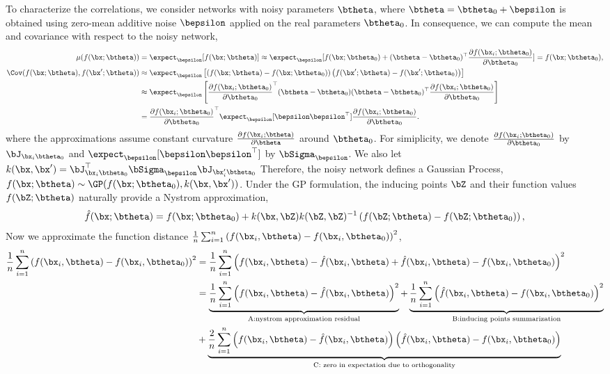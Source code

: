 To characterize the correlations, we consider networks with noisy parameters $\btheta$, where $\btheta = \btheta_0 + \bepsilon$ is obtained using zero-mean additive noise $\bepsilon$ applied on the real parameters $\btheta_0$. In consequence, we can compute the mean and covariance with respect to the noisy network,
\begin{align}
    \mu(f(\bx; \btheta)) &= \expect_{\bepsilon} [ f(\bx; \btheta)] \approx \expect_{\bepsilon}[ f(\bx; \btheta_0) + (\btheta - \btheta_0)^{\top}  \frac{\partial f(\bx_i; \btheta_0)}{\partial \btheta_0}] = f(\bx; \btheta_0), \\
    \Cov(f(\bx; \btheta), f(\bx'; \btheta)) &\approx \expect_{\bepsilon} \left[ \left(f(\bx; \btheta)-f(\bx; \btheta_0)\right) \left(f(\bx'; \btheta)-f(\bx'; \btheta_0)\right) \right] \notag \\
    &\approx \expect_{\bepsilon} \left[  \frac{\partial f(\bx_i; \btheta_0)}{\partial \btheta_0}^{\top} (\btheta - \btheta_0) (\btheta - \btheta_0)^{\top}  \frac{\partial f(\bx_i; \btheta_0)}{\partial \btheta_0} \right] \notag \\
    &=  \frac{\partial f(\bx_i; \btheta_0)}{\partial \btheta_0}^{\top} \expect_{\bepsilon} [\bepsilon \bepsilon^{\top}] \frac{\partial f(\bx_i; \btheta_0)}{\partial \btheta_0}.
\end{align}
where the approximations assume constant curvature $\frac{\partial f(\bx_i; \btheta)}{\partial \btheta}$  around $\btheta_0$. For simiplicity, we denote $\frac{\partial f(\bx_i; \btheta_0)}{\partial \btheta_0}$ by $\bJ_{\bx_i \btheta_0}$ and $\expect_{\bepsilon} [\bepsilon \bepsilon^{\top}]$ by $\bSigma_{\bepsilon}$. We also let $k(\bx, \bx') = \bJ_{\bx_i \btheta_0}^{\top}\bSigma_{\bepsilon} \bJ_{\bx'_i \btheta_0}$ Therefore, the noisy network defines a Gaussian Process, $f(\bx; \btheta) \sim \GP(f(\bx;\btheta_0), k(\bx, \bx'))$. Under the GP formulation, the inducing points $\bZ$ and their function values $f(\bZ; \btheta)$ naturally provide a Nystrom approximation,  
\begin{align}
    \hat{f}(\bx; \btheta) =  f(\bx; \btheta_0) + k(\bx, \bZ)k(\bZ, \bZ)^{-1} \left( f(\bZ; \btheta) - f(\bZ; \btheta_0) \right),
\end{align}
Now we approximate the function distance $\frac{1}{n}\sum_{i=1}^n \left(f(\bx_i, \btheta) - f(\bx_i, \btheta_0) \right)^2 $,
\begin{align}
    \frac{1}{n}\sum_{i=1}^n \left(f(\bx_i, \btheta) - f(\bx_i, \btheta_0) \right)^2 
    & = \frac{1}{n}\sum_{i=1}^n \left(f(\bx_i, \btheta) - \hat{f}(\bx_i, \btheta) + \hat{f}(\bx_i, \btheta)  - f(\bx_i, \btheta_0) \right)^2 \\
    &=\underbrace{ \frac{1}{n}\sum_{i=1}^n \left(f(\bx_i, \btheta) - \hat{f}(\bx_i, \btheta)\right)^2}_{\text{A:nystrom approximation residual}} + \underbrace{\frac{1}{n}\sum_{i=1}^n \left( \hat{f}(\bx_i, \btheta)  - f(\bx_i, \btheta_0) \right)^2}_{\text{B:inducing points summarization}} \notag \\
   &+\underbrace{\frac{2}{n}\sum_{i=1}^n \left(f(\bx_i, \btheta) - \hat{f}(\bx_i, \btheta)\right) \left( \hat{f}(\bx_i, \btheta)  - f(\bx_i, \btheta_0) \right)}_{\text{C: zero in expectation due to orthogonality}}
\end{align}
